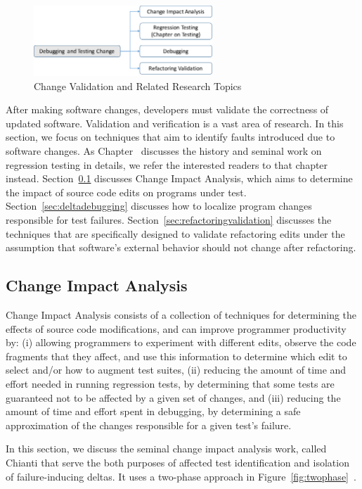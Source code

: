 \begin{figure}[ht]
 \centering
 \includegraphics[width=0.6\textwidth]{images/ChangeValidation.pdf} 
 \caption{Change Validation and Related Research Topics} 
 \label{fig:changevalidation} 
\end{figure}

After making software changes, developers must validate the correctness of updated software. Validation and verification is a vast area of research. In this section, we focus on techniques that aim to identify faults introduced due to software changes. As Chapter~ discusses the history and seminal work on regression testing in details, we refer the interested readers to that chapter instead. Section~\ref{sec:CIA} discusses Change Impact Analysis, which aims to determine the impact of source code edits on programs under test. Section~\ref{sec:deltadebugging} discusses how to localize program changes responsible for test failures. Section~\ref{sec:refactoringvalidation} discusses the techniques that are specifically designed to validate refactoring edits under the assumption that software's external behavior should not change after refactoring. 

\subsection{Change Impact Analysis} 
\label{sec:CIA} 
Change Impact Analysis consists of a collection of techniques for determining the effects of source code modifications, and can improve programmer productivity by: (i) allowing programmers to experiment with different edits, observe the code fragments that they affect, and use this information to determine which edit to select and/or how to augment test suites, (ii) reducing the amount of time and effort needed in running regression tests, by determining that some tests are guaranteed not to be affected by a given set of changes, and (iii) reducing the amount of time and effort spent in debugging, by determining a safe approximation of the changes responsible for a given test’s failure. 

	In this section, we discuss the seminal change impact analysis work, called Chianti that serve the both purposes of affected test identification and isolation of failure-inducing deltas. 
It uses a two-phase approach in Figure~\ref{fig:twophase}~\cite{Ren2004}. 

